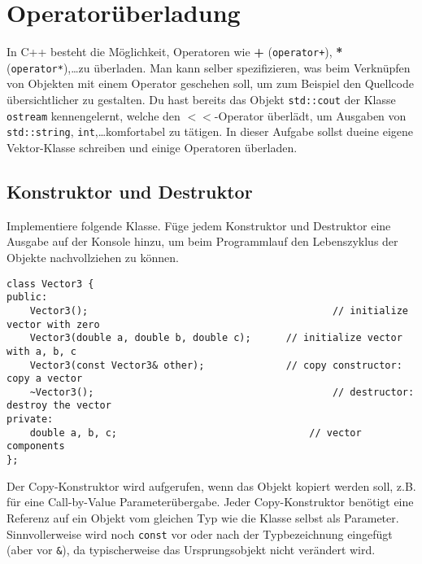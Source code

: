 \section{Operatorüberladung}
In C++ besteht die Möglichkeit, Operatoren wie \textbf{+} (\texttt{operator+}), \textbf{*} (\texttt{operator*}),\dots zu überladen.
Man kann selber spezifizieren, was beim Verknüpfen von Objekten mit einem Operator geschehen soll, um zum Beispiel den Quellcode übersichtlicher zu gestalten.
Du hast bereits das Objekt \texttt{std::cout} der Klasse \texttt{ostream} kennengelernt, welche den $<<$-Operator überlädt, um Ausgaben von \texttt{std::string}, \texttt{int},\dots komfortabel zu tätigen.
In dieser Aufgabe sollst dueine eigene Vektor-Klasse schreiben und einige Operatoren überladen.


\subsection{Konstruktor und Destruktor}
Implementiere folgende Klasse.
Füge jedem Konstruktor und Destruktor eine Ausgabe auf der Konsole hinzu, um beim Programmlauf den Lebenszyklus der Objekte nachvollziehen zu können.

\begin{lstlisting}
class Vector3 {
public:
	Vector3();											// initialize vector with zero
	Vector3(double a, double b, double c);		// initialize vector with a, b, c
	Vector3(const Vector3& other);				// copy constructor: copy a vector
	~Vector3();											// destructor: destroy the vector
private:
	double a, b, c;									// vector components
};
\end{lstlisting}

Der Copy-Konstruktor wird aufgerufen, wenn das Objekt kopiert werden soll, z.B. für eine Call-by-Value Parameterübergabe.
Jeder Copy-Konstruktor benötigt eine Referenz auf ein Objekt vom gleichen Typ wie die Klasse selbst als Parameter. 
Sinnvollerweise wird noch \texttt{const} vor oder nach der Typbezeichnung eingefügt (aber vor \texttt{\&}), da typischerweise das Ursprungsobjekt nicht verändert wird.

